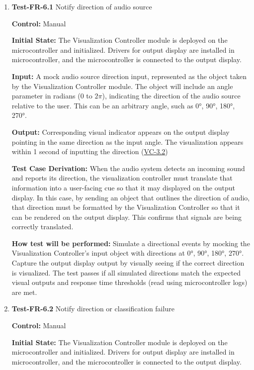 \documentclass[12pt, titlepage]{article}
\begin{document}
\begin{enumerate}

\item{\textbf{Test-FR-6.1} Notify direction of audio source \\}

\textbf{Control:} Manual
					
\textbf{Initial State:} 
The Visualization Controller module is deployed on the microcontroller and
initialized. Drivers for output display are installed in microcontroller, and
the microcontroller is connected to the output display. 
					
\textbf{Input:}
A mock audio source direction input, represented as the object taken by the
Visualization Controller module. The object will include an angle parameter in
radians (0 to $2\pi$), indicating the direction of the audio source relative to
the user. This can be an arbitrary angle, such as 0°, 90°, 180°, 270°. 
					
\textbf{Output:}
Corresponding visual indicator appears on the output display pointing in the
same direction as the input angle. The visualization appears within 1 second of
inputting the direction (\hyperref[SRS-sec:VC-3.2]{VC-3.2}) 

\textbf{Test Case Derivation:} 
When the audio system detects an incoming sound and reports its direction, the
visualization controller must translate that information into a user-facing cue
so that it may displayed on the output display. In this case, by sending an
object that outlines the direction of audio, that direction must be formatted by
the Visualization Controller so that it can be rendered on the output display.
This confirms that signals are being correctly translated.
					
\textbf{How test will be performed:}
Simulate a directional events by mocking the Visualization Controller's input
object with directions at 0°, 90°, 180°, 270°. Capture the output display output
by visually seeing if the correct direction is visualized. The test passes if
all simulated directions match the expected visual outputs and response time
thresholds (read using microcontroller logs) are met. 
					
\item{\textbf{Test-FR-6.2} Notify direction or classification failure\\}

\textbf{Control:} Manual
					
\textbf{Initial State:}
The Visualization Controller module is deployed on the microcontroller and
initialized. Drivers for output display are installed in microcontroller, and
the microcontroller is connected to the output display. 
					

\end{enumerate}
\end{document}
